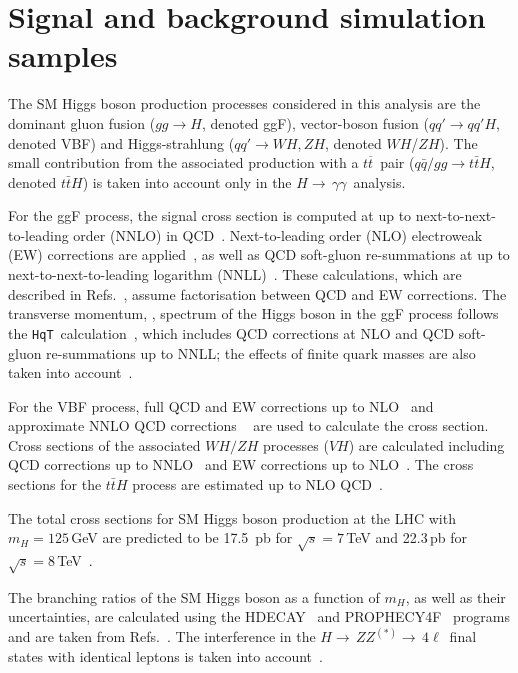 \documentclass[final,3p,times,twocolumn]{elsarticle}
\newcommand{\ttH}{\ensuremath{q\bar{q}/gg \to t\bar{t}H}}
\newcommand{\hgg}{\ensuremath{H{\rightarrow\,}\gamma\gamma}}
\newcommand\htollll{$H{\rightarrow\,}ZZ^{(*)}{\rightarrow\,}4\ell$}
\renewcommand{\ttbar}{\ensuremath{t\overline{t}}}
\begin{document}
\section{Signal and background simulation samples \label{sec:papersamples}}

The SM Higgs boson production processes considered in this analysis are the
dominant gluon fusion ($gg\to H$, denoted ggF), vector-boson
fusion ($qq'\to qq'H$, denoted VBF) and Higgs-strahlung
($qq'\to WH, ZH$, denoted $WH$/$ZH$).  
The small contribution from the associated production
with a \ttbar\ pair (\ttH, denoted $t\bar{t}H$) is taken into
account only in the \hgg\ analysis.

For the ggF process, the signal cross section is computed at up to next-to-next-to-leading order
(NNLO)
in QCD~\cite{Georgi:1977gs,Djouadi:1991tka,Dawson:1990zj,Spira:1995rr,Harlander:2002wh,Anastasiou:2002yz,Ravindran:2003um}. 
Next-to-leading order (NLO) electroweak
(EW) corrections are applied~\cite{Aglietti:2004nj,Actis:2008ug}, as
well as QCD soft-gluon re-summations at up to next-to-next-to-leading logarithm
(NNLL)~\cite{Catani:2003zt}. These calculations, which are described in
Refs.~\cite{Anastasiou:2008tj,deFlorian:2012yg,Anastasiou:2012hx,Baglio:2010ae}, assume
factorisation between QCD and EW corrections.
The transverse momentum, \pt, spectrum of the Higgs boson in the
ggF process follows the {\tt HqT}~calculation~\cite{deFlorian:2011xf}, which includes QCD corrections at NLO
and QCD soft-gluon re-summations up to NNLL;
the effects of finite quark masses are also taken into account~\cite{Bagnaschi:2011tu}.

For the VBF process, full QCD and EW corrections up to NLO~\cite{Cahn:1983ip,Ciccolini:2007jr,Ciccolini:2007ec,Arnold:2008rz} and
approximate NNLO QCD corrections ~\cite{Bolzoni:2010xr} are used to
calculate the cross section.  Cross sections of the
associated $WH/ZH$ processes ($VH$) are calculated including QCD corrections
up to NNLO~\cite{Glashow:1978ab,Han:1991ia,Brein:2003wg} and EW
corrections up to NLO~\cite{Ciccolini:2003jy}.  The cross sections for the
$t\bar{t}H$ process
are estimated up to NLO
QCD~\cite{Kunszt:1984ri,Beenakker:2001rj,Beenakker:2002nc,Dawson:2002tg,Dawson:2003zu}.

The total cross sections for SM Higgs boson production at the LHC with $m_H=125$\,GeV are predicted to
be 17.5 \,pb for $\sqrt{s}=7$\,TeV and 22.3\,pb for $\sqrt{s}=8$\,TeV~\cite{LHCHiggsCrossSectionWorkingGroup:2011ti,Dittmaier:2012vm}.

The branching ratios of the SM Higgs boson
as a function of $m_{H}$, as well as their uncertainties, are calculated using the
HDECAY~\cite{Djouadi:1997yw} and PROPHECY4F~\cite{Bredenstein:2006rh,Bredenstein:2006ha} programs
and are taken from
Refs.~\cite{LHCHiggsCrossSectionWorkingGroup:2011ti,Dittmaier:2012vm}.
The interference in the \htollll\ final states with identical leptons is taken into account~\cite{Bredenstein:2006rh,Bredenstein:2006ha,Dittmaier:2012vm}.
\end{document}
